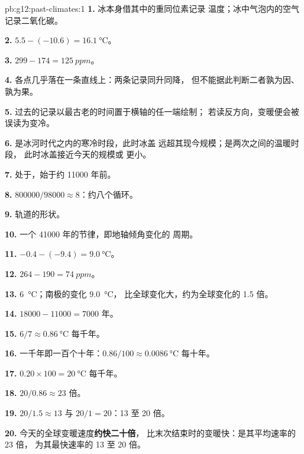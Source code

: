 \begin{solution}{pb:g12:past-climates:1}
\textbf{1.} 冰本身借其中的重同位素记录
温度；冰中气泡内的空气记录二氧化碳。

\textbf{2.} $5.5 - (-10.6) = \qty{16.1}{\degreeCelsius}$。

\textbf{3.} $299 - 174 = \qty{125}{ppm}$。

\textbf{4.} 各点几乎落在一条直线上：两条记录同升同降，
但不能据此判断二者孰为因、孰为果。

\textbf{5.} 过去的记录以最古老的时间置于横轴的任一端绘制；
若读反方向，变暖便会被误读为变冷。

\textbf{6.} 是冰河时代之内的寒冷时段，此时冰盖
远超其现今规模；是两次之间的温暖时段，
此时冰盖接近今天的规模或
更小。

\textbf{7.} 处于，始于约 \num{11000} 年前。

\textbf{8.} $\num{800000}/\num{98000} \approx 8$：约八个循环。

\textbf{9.} 轨道的形状。

\textbf{10.} 一个 \num{41000} 年的节律，即地轴倾角变化的
周期。

\textbf{11.} $-0.4 - (-9.4) = \qty{9.0}{\degreeCelsius}$。

\textbf{12.} $264 - 190 = \qty{74}{ppm}$。

\textbf{13.} \qty{6}{\degreeCelsius}；南极的变化 \qty{9.0}{\degreeCelsius}，
比全球变化大，约为全球变化的 1.5 倍。

\textbf{14.} $\num{18000} - \num{11000} = \num{7000}$ 年。

\textbf{15.} $6/7 \approx \qty{0.86}{\degreeCelsius}$ 每千年。

\textbf{16.} 一千年即一百个十年：$0.86/100 \approx
\qty{0.0086}{\degreeCelsius}$ 每十年。

\textbf{17.} $0.20 \times 100 = \qty{20}{\degreeCelsius}$ 每千年。

\textbf{18.} $20/0.86 \approx 23$ 倍。

\textbf{19.} $20/1.5 \approx 13$ 与 $20/1 = 20$：13 至 20 倍。

\textbf{20.} 今天的全球变暖速度\textbf{约快二十倍}，
比末次结束时的变暖快：是其平均速率的 23 倍，
为其最快速率的 13 至 20 倍。
\end{solution}
